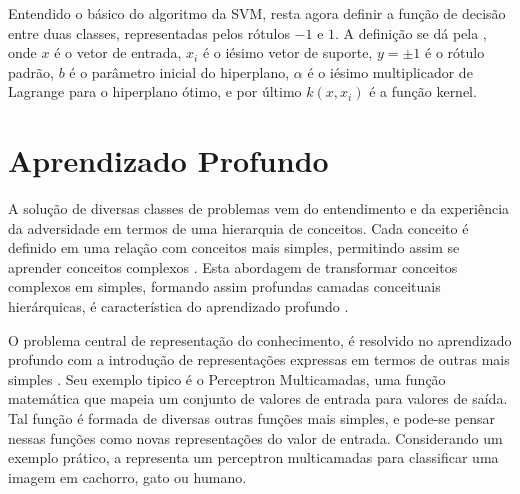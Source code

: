 


Entendido o básico do algoritmo da SVM, resta agora definir a função de decisão entre duas classes, representadas pelos rótulos $-1$ e $1$. A definição se dá pela , onde $x$ é o vetor de entrada, $x_i$ é o iésimo vetor de suporte, $y = \pm 1$ é o rótulo padrão, $b$ é o parâmetro inicial do hiperplano, $\alpha$ é o iésimo multiplicador de Lagrange para o hiperplano ótimo, e por último $k(x, x_i)$ é a função kernel.



\section{Aprendizado Profundo} 

A solução de diversas classes de problemas vem do entendimento e da experiência da adversidade em termos de uma hierarquia de conceitos. Cada conceito é definido em uma relação com conceitos mais simples, permitindo assim se aprender conceitos complexos \cite{deep_learning}. Esta abordagem de transformar conceitos complexos em simples, formando assim profundas camadas conceituais hierárquicas, é característica do aprendizado profundo \cite{deep_learning}. 

O problema central de representação do conhecimento, é resolvido no aprendizado profundo com a introdução de representações expressas em termos de outras mais simples \cite{deep_learning}. Seu exemplo tipico é o Perceptron Multicamadas, uma função matemática que mapeia um conjunto de valores de entrada para valores de saída. Tal função é formada de diversas outras funções mais simples, e pode-se pensar nessas funções como novas representações do valor de entrada. Considerando um exemplo prático, a  representa um perceptron multicamadas para classificar uma imagem em cachorro, gato ou humano. 

